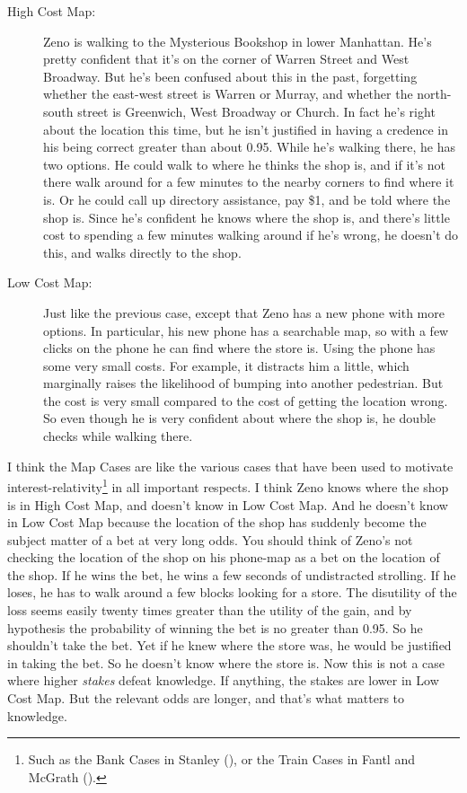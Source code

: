 \documentclass[
  10pt,
  letterpaper,
  DIV=11,
  numbers=noendperiod,
  twoside]{scrartcl}
\begin{document}
\begin{description}
\item[High Cost Map:]
Zeno is walking to the Mysterious Bookshop in lower Manhattan. He's
pretty confident that it's on the corner of Warren Street and West
Broadway. But he's been confused about this in the past, forgetting
whether the east-west street is Warren or Murray, and whether the
north-south street is Greenwich, West Broadway or Church. In fact he's
right about the location this time, but he isn't justified in having a
credence in his being correct greater than about 0.95. While he's
walking there, he has two options. He could walk to where he thinks the
shop is, and if it's not there walk around for a few minutes to the
nearby corners to find where it is. Or he could call up directory
assistance, pay \$1, and be told where the shop is. Since he's confident
he knows where the shop is, and there's little cost to spending a few
minutes walking around if he's wrong, he doesn't do this, and walks
directly to the shop.
\item[Low Cost Map:]
Just like the previous case, except that Zeno has a new phone with more
options. In particular, his new phone has a searchable map, so with a
few clicks on the phone he can find where the store is. Using the phone
has some very small costs. For example, it distracts him a little, which
marginally raises the likelihood of bumping into another pedestrian. But
the cost is very small compared to the cost of getting the location
wrong. So even though he is very confident about where the shop is, he
double checks while walking there.
\end{description}

I think the Map Cases are like the various cases that have been used to
motivate interest-relativity\footnote{Such as the Bank Cases in Stanley
  (), or the Train Cases in Fantl
  and McGrath ().} in all important
respects. I think Zeno knows where the shop is in High Cost Map, and
doesn't know in Low Cost Map. And he doesn't know in Low Cost Map
because the location of the shop has suddenly become the subject matter
of a bet at very long odds. You should think of Zeno's not checking the
location of the shop on his phone-map as a bet on the location of the
shop. If he wins the bet, he wins a few seconds of undistracted
strolling. If he loses, he has to walk around a few blocks looking for a
store. The disutility of the loss seems easily twenty times greater than
the utility of the gain, and by hypothesis the probability of winning
the bet is no greater than 0.95. So he shouldn't take the bet. Yet if he
knew where the store was, he would be justified in taking the bet. So he
doesn't know where the store is. Now this is not a case where higher
\emph{stakes} defeat knowledge. If anything, the stakes are lower in Low
Cost Map. But the relevant odds are longer, and that's what matters to
knowledge.
\end{document}
